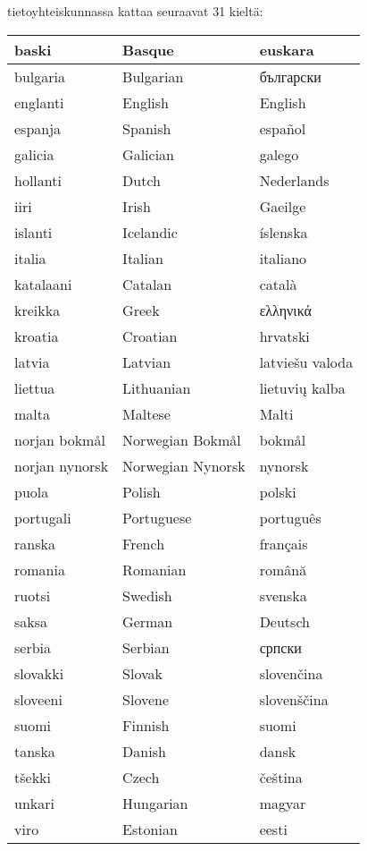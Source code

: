 \documentclass[]{../../metanetpaper}
\begin{document}
\cleardoublepage

 tietoyhteiskunnassa kattaa seuraavat 31 kieltä:
 
 \center
 
 \begin{tabular}{l|l|l}
 \hline baski & Basque & euskara\\
 \hline bulgaria & Bulgarian & български\\
 \hline englanti & English & English\\
 \hline espanja & Spanish & español\\
 \hline galicia & Galician & galego\\
 \hline hollanti & Dutch & Nederlands\\
 \hline iiri & Irish & Gaeilge\\
 \hline islanti & Icelandic & íslenska\\
 \hline italia & Italian & italiano\\
 \hline katalaani & Catalan & català\\
 \hline kreikka & Greek & ελληνικά\\
 \hline kroatia & Croatian & hrvatski\\
 \hline latvia & Latvian & latviešu valoda\\
 \hline liettua & Lithuanian & lietuvių kalba\\
 \hline malta & Maltese & Malti\\
 \hline norjan bokmål & Norwegian Bokmål & bokmål\\
 \hline norjan nynorsk & Norwegian Nynorsk & nynorsk\\
 \hline puola & Polish & polski\\
 \hline portugali & Portuguese & português\\
 \hline ranska & French & français\\
 \hline romania & Romanian & română\\
 \hline ruotsi & Swedish & svenska\\
 \hline saksa & German & Deutsch\\
 \hline serbia & Serbian & српски\\
 \hline slovakki & Slovak & slovenčina\\
 \hline sloveeni & Slovene & slovenščina\\
 \hline suomi & Finnish & suomi\\
 \hline tanska & Danish & dansk\\
 \hline tšekki & Czech & čeština\\
 \hline unkari & Hungarian & magyar\\
 \hline viro & Estonian & eesti\\
 \end{tabular}
\end{document}
